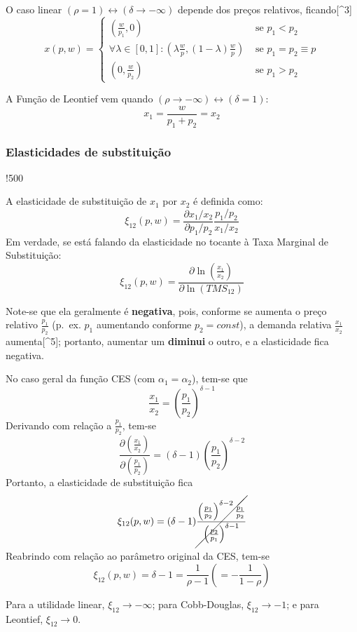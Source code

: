 \documentclass[12pt]{article}
\numberwithin{equation}{section}
\theoremstyle{plain}
\theoremstyle{definition}
\theoremstyle{remark}
\begin{document}
O caso linear \((\rho=1) \leftrightarrow (\delta \to -\infty)\) depende
dos preços relativos, ficando{[}\^{}3{]} \[
x(p, w) = 
\begin{cases}
\left( \frac{w}{p_{1}}, 0 \right) \,\, &\text{se } p_{1} < p_{2}  \\
\forall \lambda \in [0,1]: \left( \lambda \frac{w}{p}, (1-\lambda) \frac{w}{p} \right) \,\, &\text{se } p_{1} = p_{2} \equiv p \\
\left( 0, \frac{w}{p_{2}} \right) \,\, &\text{se } p_{1} > p_{2}
\end{cases}
\]

A Função de Leontief vem quando
\((\rho \to -\infty) \leftrightarrow (\delta = 1)\): \[
x_{1} = \frac{w}{p_{1} + p_{2}} = x_{2}
\]

\hypertarget{elasticidades-de-substituiuxe7uxe3o}{%
\subsubsection{Elasticidades de
substituição}\label{elasticidades-de-substituiuxe7uxe3o}}

!500

A elasticidade de substituição de \(x_{1}\) por \(x_{2}\) é definida
como: \[
\xi_{12}(p, w) = \frac{ \partial x_{1}/x_{2} }{ \partial p_{1}/p_{2} } \frac{ p_{1}/p_{2}}{x_{1}/x_{2}} 
\] Em verdade, se está falando da elasticidade no tocante à Taxa
Marginal de Substituição: \[
\xi_{12}(p, w) = \frac{ \partial \ln (\frac{x_{1}}{x_{2}}) }{ \partial \ln(TMS_{12}) } 
\]

Note-se que ela geralmente é \textbf{negativa}, pois, conforme se
aumenta o preço relativo \(\frac{p_{1}}{p_{2}}\) (p.~ex. \(p_{1}\)
aumentando conforme \(p_{2}=const\)), a demanda relativa
\(\frac{x_{1}}{x_{2}}\) aumenta{[}\^{}5{]}; portanto, aumentar um
\textbf{diminui} o outro, e a elasticidade fica negativa.

No caso geral da função CES (com \(\alpha_{1} = \alpha_{2}\)), tem-se
que \[
\frac{x_{1}}{x_{2}} = \left( \frac{p_{1}}{p_{2}} \right)^{\delta-1}
\] Derivando com relação a \(\frac{p_{1}}{p_{2}}\), tem-se \[
\frac{ \partial \left( \frac{x_{1}}{x_{2}} \right) }{ \partial \left( \frac{p_{1}}{p_{2}} \right) } = (\delta-1) \left( \frac{p_{1}}{p_{2}} \right)^{\delta-2} 
\] Portanto, a elasticidade de substituição fica \[
\xi_{12}(p,w) = (\delta - 1) \cancel{ \frac{\left( \frac{p_{1}}{p_{2}} \right)^{\delta - 2} \frac{p_{1}}{p_{2}}}{\left( \frac{p_{2}}{p_{1}} \right)^{\delta - 1}} }
\] Reabrindo com relação ao parâmetro original da CES, tem-se \[
\xi_{12}(p,w) = \delta - 1 = \frac{1}{\rho - 1} \left( = - \frac{1}{1 - \rho} \right)
\]

Para a utilidade linear, \(\xi_{12} \to - \infty\); para Cobb-Douglas,
\(\xi_{12} \to -1\); e para Leontief, \(\xi_{12} \to 0\).

\printbibliography
\end{document}
